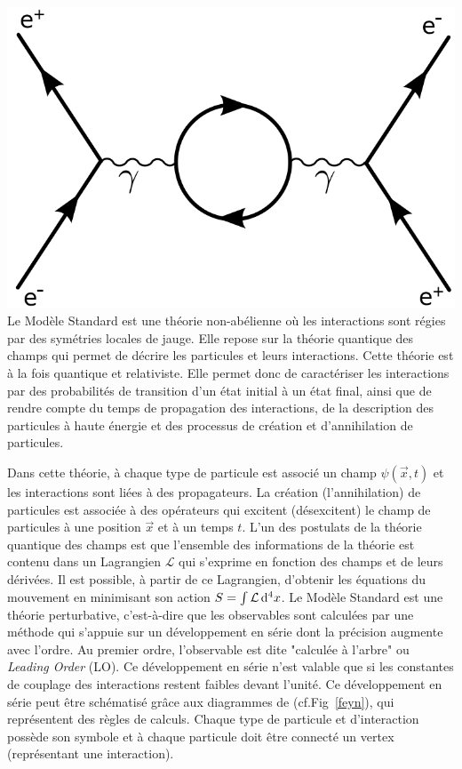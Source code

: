 {	\includegraphics[width=\marginparwidth]{SM/feyn3.png}
	\label{feyn}
}
Le Modèle Standard est une théorie non-abélienne où les interactions sont régies par des symétries locales de jauge. Elle repose sur la théorie quantique des champs qui permet de décrire les particules et leurs interactions. Cette théorie est à la fois quantique et relativiste. Elle permet donc de caractériser les interactions par des probabilités de transition d'un état initial à un état final, ainsi que de rendre compte du temps de propagation des interactions, de la description des particules à haute énergie et des processus de création et d'annihilation de particules.

Dans cette théorie, à chaque type de particule est associé un champ $\psi(\vec{x},t)$ et les interactions sont liées à des propagateurs. La création (l'annihilation) de particules est associée à des opérateurs qui excitent (désexcitent) le champ de particules à une position $\vec{x}$ et à un temps $t$. L'un des postulats de la théorie quantique des champs est que l'ensemble des informations de la théorie est contenu dans un Lagrangien $\mathcal{L}$ qui s'exprime en fonction des champs et de leurs dérivées. Il est possible, à partir de ce Lagrangien, d'obtenir les équations du mouvement en minimisant son action $S=\int\mathcal{L}\mathop{}\!\mathrm{d^4}{x}$.
Le Modèle Standard est une théorie perturbative, c'est-à-dire que les observables sont calculées par une méthode qui s'appuie sur un développement en série dont la précision augmente avec l'ordre. Au premier ordre, l'observable est dite "calculée à l'arbre" ou \textit{Leading Order} (LO). Ce développement en série n'est valable que si les constantes de couplage des interactions restent faibles devant l'unité. Ce développement en série peut être schématisé grâce aux diagrammes de  (cf.Fig~\ref{feyn}), qui représentent des règles de calculs. Chaque type de particule et d'interaction possède son symbole et à chaque particule doit être connecté un vertex (représentant une interaction).

